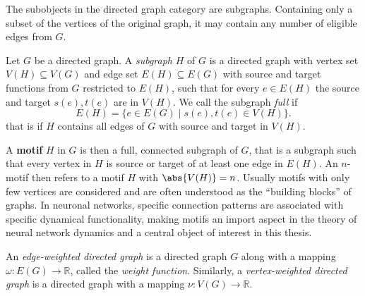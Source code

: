 The subobjects in the directed graph category are
subgraphs. Containing only a subset of the vertices of the original
graph, it may contain any number of eligible edges from $G$.

\begin{definition}[Subgraph]
  Let $G$ be a directed graph. A \textit{subgraph} $H$ of $G$ is a
  directed graph with vertex set $V(H) \subseteq V(G)$ and edge set
  $E(H) \subseteq E(G)$ with source and target functions from $G$
  restricted to $E(H)$, such that for every $e \in E(H)$ the source
  and target $s(e),t(e)$ are in $V(H)$. We call the subgraph
  \textit{full} if 
  \[
    E(H) = \{e \in E(G) \mid s(e), t(e) \in V(H)\}.
  \]
  that is if $H$ contains all edges of $G$ with source and target in
  $V(H)$.
\end{definition}

A \textbf{motif} $H$ in $G$ is then a full, connected
subgraph of $G$, that is a subgraph such that every vertex in $H$ is
source or target of at least one edge in $E(H)$. An $n$-motif then
refers to a motif $H$ with $\abs{V(H)} = n$. Usually motifs with only
few vertices are considered and are often understood as the
\enquote{building blocks} of graphs. In neuronal networks, specific
connection patterns are associated with specific dynamical
functionality, making motifs an import aspect in the theory of neural
network dynamics and a central object of interest in this thesis.

\begin{definition}
  An \textit{edge-weighted directed graph} is a directed graph $G$ along
  with a mapping $\omega: E(G) \to \mathbb{R}$, called the
  \textit{weight function}. Similarly, a \textit{vertex-weighted
    directed graph} is a directed graph with a mapping $\nu: V(G) \to
  \mathbb{R}$.
\end{definition}





